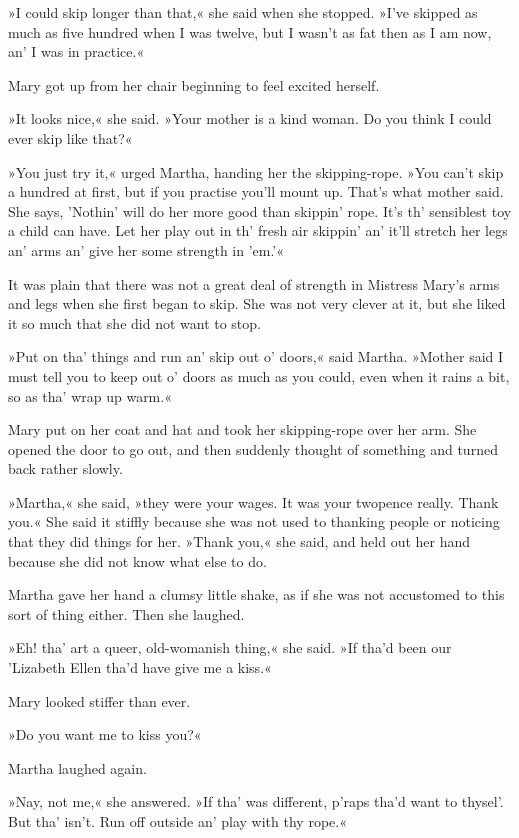 »I could skip longer than that,« she said when she stopped. »I've skipped as much as five hundred when I was twelve, but I wasn't as fat then as I am now, an' I was in practice.«

Mary got up from her chair beginning to feel excited herself.

»It looks nice,« she said. »Your mother is a kind woman. Do you think I could ever skip like that?«

»You just try it,« urged Martha, handing her the skipping-rope. »You can't skip a hundred at first, but if you practise you'll mount up. That's what mother said. She says, 'Nothin' will do her more good than skippin' rope. It's th' sensiblest toy a child can have. Let her play out in th' fresh air skippin' an' it'll stretch her legs an' arms an' give her some strength in 'em.'«

It was plain that there was not a great deal of strength in Mistress Mary's arms and legs when she first began to skip. She was not very clever at it, but she liked it so much that she did not want to stop.

»Put on tha' things and run an' skip out o' doors,« said Martha. »Mother said I must tell you to keep out o' doors as much as you could, even when it rains a bit, so as tha' wrap up warm.«

Mary put on her coat and hat and took her skipping-rope over her arm. She opened the door to go out, and then suddenly thought of something and turned back rather slowly.

»Martha,« she said, »they were your wages. It was your twopence really. Thank you.« She said it stiffly because she was not used to thanking people or noticing that they did things for her. »Thank you,« she said, and held out her hand because she did not know what else to do.

Martha gave her hand a clumsy little shake, as if she was not accustomed to this sort of thing either. Then she laughed.

»Eh! tha' art a queer, old-womanish thing,« she said. »If tha'd been our 'Lizabeth Ellen tha'd have give me a kiss.«

Mary looked stiffer than ever.

»Do you want me to kiss you?«

Martha laughed again.

»Nay, not me,« she answered. »If tha' was different, p'raps tha'd want to thysel'. But tha' isn't. Run off outside an' play with thy rope.«

